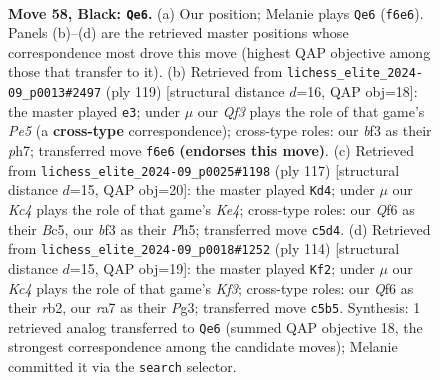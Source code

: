 \documentclass[11pt]{article}
\begin{document}
\clearpage

\begin{figure}[p]\centering
\begin{subfigure}{0.46\textwidth}\centering
\resizebox{\linewidth}{!}{%
\newchessgame
\chessboard[
  setfen={8/R7/5q2/2k5/1p6/b4BK1/8/8 b - - 7 58},
  showmover=false,
  pgfstyle=straightmove, color=movearrow, markmove={f6-e6}
]}
\caption{}
\end{subfigure}\hfill
\begin{subfigure}{0.46\textwidth}\centering
\resizebox{\linewidth}{!}{%
\newchessgame
\chessboard[
  setfen={8/7P/4k3/1R6/4p1K1/p7/1b6/8 b - - 0 60},
  showmover=false,
  pgfstyle=straightmove, color=movearrow, markmove={e4-e3}
]}
\caption{}
\end{subfigure}
\\[4pt]
\begin{subfigure}{0.46\textwidth}\centering
\resizebox{\linewidth}{!}{%
\newchessgame
\chessboard[
  setfen={8/8/8/1pb1k2p/2b5/8/6K1/2R5 b - - 7 59},
  showmover=false,
  pgfstyle=straightmove, color=movearrow, markmove={e5-d4}
]}
\caption{}
\end{subfigure}\hfill
\begin{subfigure}{0.46\textwidth}\centering
\resizebox{\linewidth}{!}{%
\newchessgame
\chessboard[
  setfen={8/8/8/4k3/8/5KP1/1r2B2P/8 w - - 8 58},
  showmover=false,
  pgfstyle=straightmove, color=movearrow, markmove={f3-f2}
]}
\caption{}
\end{subfigure}
\caption{\textbf{Move 58, Black: \texttt{Qe6}.} (a) Our position; Melanie plays \texttt{Qe6} (\texttt{f6e6}). Panels (b)--(d) are the retrieved master positions whose correspondence most drove this move (highest QAP objective among those that transfer to it). (b) Retrieved from \texttt{lichess\_elite\_2024-09\_p0013\#2497} (ply 119) [structural distance $d$=16, QAP obj=18]: the master played \texttt{e3}; under $\mu$ our \emph{Qf3} plays the role of that game's \emph{Pe5} (a \textbf{cross-type} correspondence); cross-type roles: our \emph{b}f3 as their \emph{p}h7; transferred move \texttt{f6e6} \textbf{(endorses this move)}. (c) Retrieved from \texttt{lichess\_elite\_2024-09\_p0025\#1198} (ply 117) [structural distance $d$=15, QAP obj=20]: the master played \texttt{Kd4}; under $\mu$ our \emph{Kc4} plays the role of that game's \emph{Ke4}; cross-type roles: our \emph{Q}f6 as their \emph{B}c5, our \emph{b}f3 as their \emph{P}h5; transferred move \texttt{c5d4}. (d) Retrieved from \texttt{lichess\_elite\_2024-09\_p0018\#1252} (ply 114) [structural distance $d$=15, QAP obj=19]: the master played \texttt{Kf2}; under $\mu$ our \emph{Kc4} plays the role of that game's \emph{Kf3}; cross-type roles: our \emph{Q}f6 as their \emph{r}b2, our \emph{r}a7 as their \emph{P}g3; transferred move \texttt{c5b5}. Synthesis: 1 retrieved analog transferred to \texttt{Qe6} (summed QAP objective 18, the strongest correspondence among the candidate moves); Melanie committed it via the \texttt{search} selector.}
\label{fig:thought-m115}
\end{figure}
\end{document}
